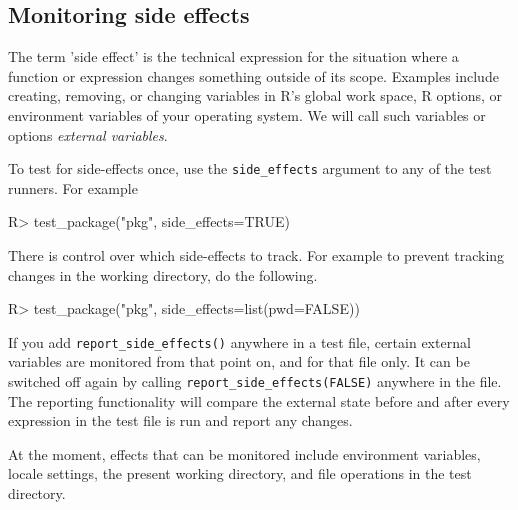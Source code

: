 \documentclass[11pt]{article}
\newcommand{\code}[1]{\texttt{#1}}
\begin{document}
\subsection{Monitoring side effects}
\label{sect:side}
The term 'side effect' is the technical expression for the situation where a
function or expression changes something outside of its scope. Examples include
creating, removing, or changing variables in R's global work space, R options,
or environment variables of your operating system.  We will call such variables
or options \emph{external variables}.

To test for side-effects once, use the \code{side\_effects} argument
to any of the test runners. For example
\begin{Schunk}
\begin{Sinput}
R>  test_package("pkg", side_effects=TRUE)
\end{Sinput}
\end{Schunk}
There is control over which side-effects to track. For example to prevent
tracking changes in the working directory, do the following.
\begin{Schunk}
\begin{Sinput}
R>  test_package("pkg", side_effects=list(pwd=FALSE))
\end{Sinput}
\end{Schunk}


If you add \code{report\_side\_effects()} anywhere in a test file, certain
external variables are  monitored from that point on, and for that file only.
It can be switched off again by calling \code{report\_side\_effects(FALSE)}
anywhere in the file.  The reporting functionality will compare the external
state before and after every expression in the test file is run and report any
changes. 

At the moment, effects that can be monitored include environment
variables, locale settings, the present working directory, and file operations
in the test directory.
\end{document}

